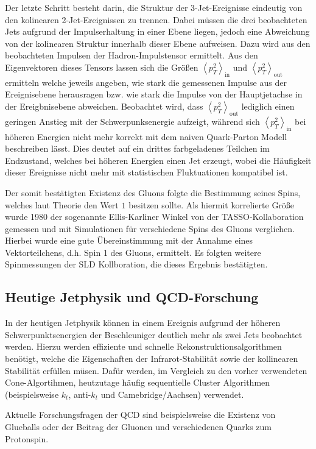 Der letzte Schritt besteht darin, die Struktur der 3-Jet-Ereignisse eindeutig von den kolinearen 2-Jet-Ereignissen zu trennen.
Dabei müssen die drei beobachteten Jets aufgrund der Impulserhaltung in einer Ebene liegen, jedoch eine Abweichung von der kolinearen Struktur innerhalb dieser Ebene aufweisen.
Dazu wird aus den beobachteten Impulsen der Hadron-Impulstensor ermittelt.
Aus den Eigenvektoren dieses Tensors lassen sich die Größen $\left<p_T^2\right>_\text{in}$ und $\left<p_T^2\right>_\text{out}$ ermitteln welche jeweils angeben, wie stark die gemessenen Impulse aus der Ereignisebene herausragen bzw. wie stark die Impulse von der Hauptjetachse in der Ereigbnisebene abweichen.
Beobachtet wird, dass $\left<p_T^2\right>_\text{out}$ lediglich einen geringen Anstieg mit der Schwerpunksenergie aufzeigt, während sich $\left<p_T^2\right>_\text{in}$ bei höheren Energien nicht mehr korrekt mit dem naiven Quark-Parton Modell beschreiben lässt.
Dies deutet auf ein drittes farbgeladenes Teilchen im Endzustand, welches bei höheren Energien einen Jet erzeugt, wobei die Häufigkeit dieser Ereignisse nicht mehr mit statistischen Fluktuationen kompatibel ist.

Der somit bestätigten Existenz des Gluons folgte die Bestimmung seines Spins, welches laut Theorie den Wert $1$ besitzen sollte.
Als hiermit korrelierte Größe wurde 1980 der sogenannte Ellis-Karliner Winkel von der TASSO-Kollaboration gemessen und mit Simulationen für verschiedene Spins des Gluons verglichen.
Hierbei wurde eine gute Übereinstimmung mit der Annahme eines Vektorteilchens, d.h. Spin 1 des Gluons, ermittelt.
Es folgten weitere Spinmessungen der SLD Kollboration, die dieses Ergebnis bestätigten.

\subsection{Heutige Jetphysik und QCD-Forschung}

In der heutigen Jetphysik können in einem Ereignis aufgrund der höheren Schwerpunktsenergien der Beschleuniger deutlich mehr als zwei Jets beobachtet werden.
Hierzu werden effiziente und schnelle Rekonstruktionsalgorithmen benötigt, welche die Eigenschaften der Infrarot-Stabilität sowie der kollinearen Stabilität erfüllen müsen.
Dafür werden, im Vergleich zu den vorher verwendeten Cone-Algortihmen, heutzutage häufig sequentielle Cluster Algorithmen (beispielsweise $k_t$, anti-$k_t$ und Camebridge/Aachsen) verwendet.

Aktuelle Forschungsfragen der QCD sind beispielsweise die Existenz von Glueballs oder der Beitrag der Gluonen und verschiedenen Quarks zum Protonspin.

